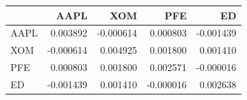 \begin{tabular}{lrrrr}
\toprule
 & AAPL & XOM & PFE & ED \\
\midrule
AAPL & 0.003892 & -0.000614 & 0.000803 & -0.001439 \\
XOM & -0.000614 & 0.004925 & 0.001800 & 0.001410 \\
PFE & 0.000803 & 0.001800 & 0.002571 & -0.000016 \\
ED & -0.001439 & 0.001410 & -0.000016 & 0.002638 \\
\bottomrule
\end{tabular}
